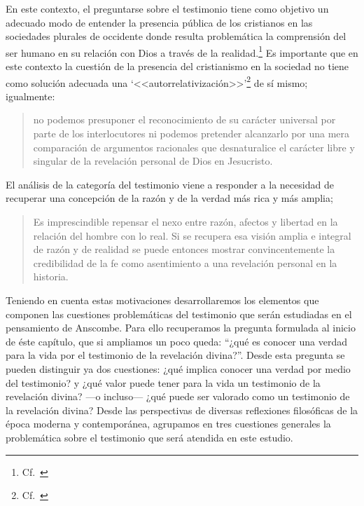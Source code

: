 En este contexto, el preguntarse sobre el testimonio tiene como objetivo un
adecuado modo de entender la presencia pública de los cristianos en las
sociedades plurales de occidente donde resulta problemática la comprensión del
ser humano en su relación con Dios a través de la
realidad.\footnote{Cf.~\cite[75]{prades2015testimonio}} Es importante que en
este contexto la cuestión de la presencia del cristianismo en la sociedad no
tiene como solución adecuada una
\enquote*{<<autorrelativización>>}\footnote{Cf.~\cite[75;\,40--44]{prades2015testimonio}}
de sí mismo; igualmente:
\blockquote[{\cite[75; Cf.~33--40]{prades2015testimonio}}]{no podemos presuponer
  el reconocimiento de su carácter universal por parte de los interlocutores ni
  podemos pretender alcanzarlo por una mera comparación de argumentos racionales
  que desnaturalice el carácter libre y singular de la revelación personal de
  Dios en Jesucristo.}
El análisis de la categoría del testimonio viene a responder a la necesidad de
recuperar una concepción de la razón y de la verdad más rica y más amplia;
\blockquote[{\cite[76]{prades2015testimonio}}]{Es imprescindible repensar el
  nexo entre razón, afectos y libertad en la relación del hombre con lo real. Si
  se recupera esa visión amplia e integral de razón y de realidad se puede
  entonces mostrar convincentemente la credibilidad de la fe como asentimiento a
  una revelación personal en la historia.}

Teniendo en cuenta estas motivaciones desarrollaremos los elementos que componen
las cuestiones problemáticas del testimonio que serán estudiadas en el
pensamiento de Anscombe. Para ello recuperamos la pregunta formulada al inicio
de éste capítulo, que si ampliamos un poco queda: \enquote{¿qué es conocer una
  verdad para la vida por el testimonio de la revelación divina?}. Desde esta
pregunta se pueden distinguir ya dos cuestiones: ¿qué implica conocer una verdad
por medio del testimonio? y ¿qué valor puede tener para la vida un testimonio de
la revelación divina? ---o incluso--- ¿qué puede ser valorado como un testimonio
de la revelación divina? Desde las perspectivas de diversas reflexiones
filosóficas de la época moderna y contemporánea, agrupamos en tres cuestiones
generales la problemática sobre el testimonio que será atendida en este estudio.

